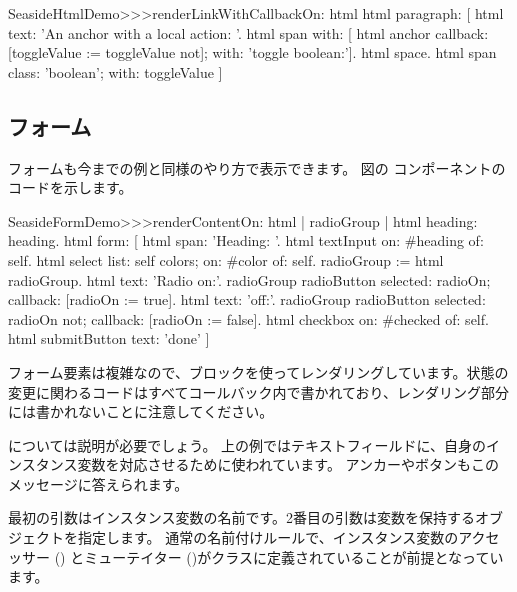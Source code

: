 \documentclass[a4paper,10pt,twoside]{book}
\begin{document}
\begin{code}{}
SeasideHtmlDemo>>>renderLinkWithCallbackOn: html 
	html paragraph: [
		html text: 'An anchor with a local action: '.
		html span with: [
			html anchor
				callback: [toggleValue := toggleValue not];
				with: 'toggle boolean:'].
		html space.
		html span
			class: 'boolean';
			with: toggleValue ]
\end{code}


\subsection{フォーム}

フォームも今までの例と同様のやり方で表示できます。
図の コンポーネントのコードを示します。

\begin{code}{}
SeasideFormDemo>>>renderContentOn: html
	| radioGroup |
	html heading: heading.
	html form: [
		html span: 'Heading: '.
		html textInput on: #heading of: self.
		html select
			list: self colors;
			on: #color of: self.
		radioGroup := html radioGroup.
		html text: 'Radio on:'.
		radioGroup radioButton
			selected: radioOn;
			callback: [radioOn := true].
		html text: 'off:'.
		radioGroup radioButton
			selected: radioOn not;
			callback: [radioOn := false].
		html checkbox on: #checked of: self.
		html submitButton
			text: 'done' ]
\end{code}{}

フォーム要素は複雑なので、ブロックを使ってレンダリングしています。状態の変更に関わるコードはすべてコールバック内で書かれており、レンダリング部分には書かれないことに注意してください。

 については説明が必要でしょう。
上の例ではテキストフィールドに、自身のインスタンス変数を対応させるために使われています。
アンカーやボタンもこのメッセージに答えられます。

最初の引数はインスタンス変数の名前です。2番目の引数は変数を保持するオブジェクトを指定します。
通常の名前付けルールで、インスタンス変数のアクセッサー () とミューテイター ()がクラスに定義されていることが前提となっています。
\end{document}
